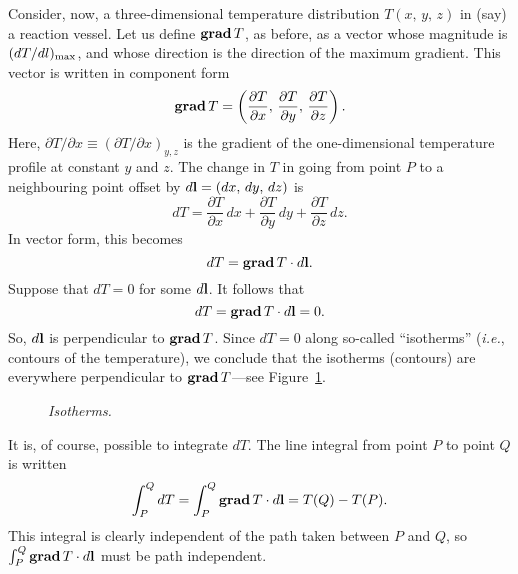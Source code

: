 Consider, now, a three-dimensional temperature distribution $T(x,\,y,\,z)$ in 
(say) a
reaction vessel.  Let us define
${\bf grad}\,T$, as before, as a vector whose magnitude is $(dT/dl)_{\rm max}$,
and whose direction is the direction of the maximum gradient. 
This vector is written in component form
\begin{equation}
{\bf grad}\,T = \left(\frac{\partial T}{\partial x}, \,\frac{\partial T}{\partial y},\,
\frac{\partial T}{\partial z}\right).
\end{equation}
Here, $\partial T/\partial x\equiv (\partial T/\partial x)_{y, z}$ is the
gradient of the one-dimensional temperature profile at constant $y$ and $z$. 
The change in $T$ in going from point $P$ to a neighbouring point offset by
$d{\bf l}= (dx,\,dy,\,dz)$ is
\begin{equation}
dT = \frac{\partial T}{\partial x}\,dx +\frac{\partial T}{\partial y}\,dy+
 \frac{\partial T}{\partial z}\,dz.
\end{equation}
In vector form, this becomes
\begin{equation}
dT = {\bf grad}\,T \cdot d{\bf l}.
\end{equation}
Suppose that $dT=0$ for some $d{\bf l}$. It follows that
\begin{equation}
dT = {\bf grad}\,T \cdot d{\bf l} = 0.
\end{equation}
So, $d{\bf l}$ is perpendicular to ${\bf grad}\,T$. Since $dT=0$ along so-called
``isotherms'' ({\em i.e.}, contours of the temperature), we conclude that the isotherms
(contours) are everywhere perpendicular to ${\bf grad}\,T$---see Figure~\ref{f16}.
\begin{figure}
\centerline{}
\caption{\em Isotherms.}\label{f16}
\end{figure}
It is, of course, possible to integrate $dT$. The line integral from point $P$ to
point $Q$ is written
\begin{equation}
\int_P^Q dT = \int_P^Q {\bf grad}\,T\cdot d{\bf l} = T(Q)-T(P).
\end{equation}
This integral is clearly independent of the path taken between $P$ and $Q$, so
$\int_P^Q {\bf grad }\,T\cdot d{\bf l}$ must be path independent. 


